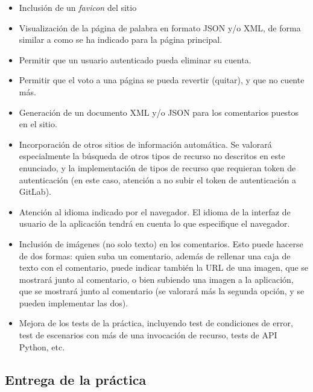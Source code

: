 \begin{itemize}
  \item Inclusión de un \emph{favicon} del sitio

  \item Visualización de la página de palabra en formato JSON y/o XML, de forma similar a como se ha indicado para la página principal.

  \item Permitir que un usuario autenticado pueda eliminar su cuenta.

  \item Permitir que el voto a una página se pueda revertir (quitar), y que no cuente más.

  \item Generación de un documento XML y/o JSON para los comentarios puestos en el sitio.

  \item Incorporación de otros sitios de información automática. Se valorará especialmente la búsqueda de otros tipos de recurso no descritos en este enunciado, y la implementación de tipos de recurso que requieran token de autenticación (en este caso, atención a no subir el token de autenticación a GitLab).
 
  \item Atención al idioma indicado por el navegador. El idioma de la interfaz de usuario de la aplicación tendrá en cuenta lo que especifique el navegador.

  \item Inclusión de imágenes (no solo texto) en los comentarios. Esto puede hacerse de dos formas: quien suba un comentario, además de rellenar una caja de texto con el comentario, puede indicar también la URL de una imagen, que se mostrará junto al comentario, o bien subiendo una imagen a la aplicación, que se mostrará junto al comentario (se valorará más la segunda opción, y se pueden implementar las dos).
    
  \item Mejora de los tests de la práctica, incluyendo test de condiciones de error, test de escenarios con más de una invocación de recurso, tests de API Python, etc.
\end{itemize}

\subsection{Entrega de la práctica}

